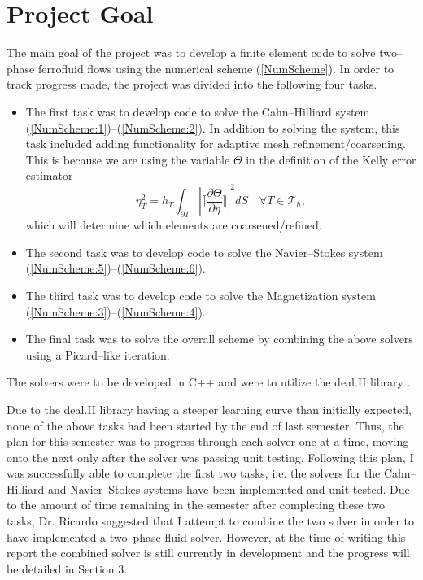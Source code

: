 \documentclass[11pt,fullpage]{article}
\newcommand{\Tau}{\mathcal{T}}
\newcommand{\abs}[1]{\left\vert#1\right\vert}
\theoremstyle{lemma}
\theoremstyle{definition}
\theoremstyle{lemma}
\begin{document}
\section{Project Goal}
The main goal of the project was to develop a finite element code to solve two--phase ferrofluid flows using the numerical scheme (\ref{NumScheme}). In order to track progress made, the project was divided into the following four tasks. 
\begin{itemize}
	\item The first task was to develop code to solve the Cahn--Hilliard system (\ref{NumScheme:1})--(\ref{NumScheme:2}). In addition to solving the system, this task included adding functionality for adaptive mesh refinement/coarsening. This is because we are using the variable $\Theta$ in the definition of the Kelly error estimator \cite{ErrorInd}
	\begin{equation}\label{ErrorInd}
	\eta_T^2 = h_T\int_{\partial T}\abs{\bigg\llbracket\frac{\partial \Theta}{\partial \eta}\bigg\rrbracket}^2dS \quad \forall T\in\Tau_h,
	\end{equation}
	which will determine which elements are coarsened/refined. 
	
	\item The second task was to develop code to solve the Navier--Stokes system (\ref{NumScheme:5})--(\ref{NumScheme:6}).
	
	\item The third task was to develop code to solve the Magnetization system (\ref{NumScheme:3})--(\ref{NumScheme:4}). 
	
	\item The final task was to solve the overall scheme by combining the above solvers using a Picard--like iteration.
\end{itemize}
The solvers were to be developed in C++ and were to utilize the deal.II library \cite{AdaptiveMesh:1, DealII}. 

Due to the deal.II library having a steeper learning curve than initially expected, none of the above tasks had been started by the end of last semester. Thus, the plan for this semester was to progress through each solver one at a time, moving onto the next only after the solver was passing unit testing. Following this plan, I was successfully able to complete the first two tasks, i.e. the solvers for the Cahn--Hilliard and Navier--Stokes systems have been implemented and unit tested. Due to the amount of time remaining in the semester after completing these two tasks, Dr. Ricardo suggested that I attempt to combine the two solver in order to have implemented a two--phase fluid solver. However, at the time of writing this report the combined solver is still currently in development and the progress will be detailed in Section 3.
\end{document}
